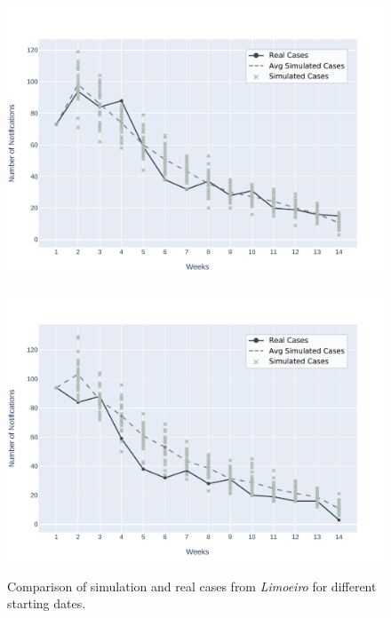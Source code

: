 \begin{figure}[!ht]
\begin{minipage}[c]{.45\textwidth}
        \centering
        \includegraphics[scale=0.4]{images/experiments-lim/LIM-2020-07-19.pdf} \\
      \end{minipage}
    \hspace{0.5cm}
    \begin{minipage}[c]{.45\textwidth}
        \centering
        \includegraphics[scale=0.4]{images/experiments-lim/LIM-2020-07-26.pdf} \\
      \end{minipage}
    \caption{\label{fig:avg-result-lim} Comparison of simulation and real cases from \textit{Limoeiro} for different starting dates.}
\end{figure}

